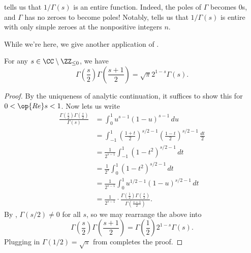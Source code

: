 \documentclass[../notes.tex]{subfiles}
\begin{document}
\begin{remark} \label{rem:recip-gamma-entire}
	 tells us that $1/\Gamma(s)$ is an entire function. Indeed, the poles of $\Gamma$ becomes $0$s, and $\Gamma$ has no zeroes to become poles! Notably,  tells us that $1/\Gamma(s)$ is entire with only simple zeroes at the nonpositive integers $n$.
\end{remark}
While we're here, we give another application of .
\begin{proposition} \label{prop:duplicate-gamma}
	For any $s\in\CC\setminus\ZZ_{\le0}$, we have
	\[\Gamma\left(\frac s2\right)\Gamma\left(\frac{s+1}2\right)=\sqrt\pi2^{1-s}\Gamma(s).\]
\end{proposition}
\begin{proof}
	By the uniqueness of analytic continuation, it suffices to show this for $0<\op{Re}s<1$. Now  lets us write
	\begin{align*}
		\frac{\Gamma\left(\frac s2\right)\Gamma\left(\frac s2\right)}{\Gamma(s)} &= \int_0^1u^{s-1}(1-u)^{s-1}\,du \\
		&= \int_{-1}^1\left(\frac{1+t}2\right)^{s/2-1}\left(\frac{1-t}2\right)^{s/2-1}\,\frac{dt}2 \\
		&= \frac1{2^{s-1}}\int_{-1}^1\left(1-t^2\right)^{s/2-1}\,dt \\
		&= \frac1{2^s}\int_0^1\left(1-t^2\right)^{s/2-1}\,dt \\
		&= \frac1{2^{s-1}}\int_0^1u^{1/2-1}(1-u)^{s/2-1}\,dt \\
		&= \frac1{2^{s-1}}\cdot\frac{\Gamma\left(\frac12\right)\Gamma\left(\frac s2\right)}{\Gamma\left(\frac{s+1}2\right)}.
	\end{align*}
	By , $\Gamma(s/2)\ne0$ for all $s$, so we may rearrange the above into
	\[\Gamma\left(\frac s2\right)\Gamma\left(\frac{s+1}2\right)=\Gamma\left(\frac12\right)2^{1-s}\Gamma(s).\]
	Plugging in $\Gamma(1/2)=\sqrt\pi$ from  completes the proof.
\end{proof}
\end{document}
